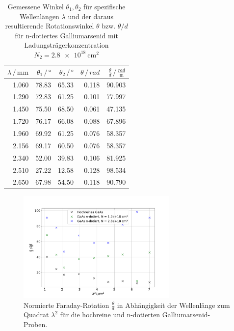 \begin{table}
    \centering
    \caption{Gemessene Winkel $\theta_1, \theta_2$ für spezifische Wellenlängen $\lambda$ und der daraus resultierende Rotationswinkel $\theta$ bzw. $\theta/d$ für n-dotiertes Galliumarsenid mit Ladungsträgerkonzentration $N_2 = \qty{2.8e18}{\centi\metre^2}$}
    \label{tab:N2}
    \begin{tabular}{r r r r r}
        \toprule
        $\lambda \,/\, \unit{\milli\metre}$ & $\theta_1 \,/\, \unit{\degree}$ & $\theta_2 \,/\, \unit{\degree}$ & $\theta \,/\, \unit{rad}$ & $\frac{\theta}{d} \,/\, \frac{rad}{\unit{\metre}}$ \\
        \midrule
        1.060 & 78.83 & 65.33 & 0.118 & 90.903 \\
        1.290 & 72.83 & 61.25 & 0.101 & 77.997 \\
        1.450 & 75.50 & 68.50 & 0.061 & 47.135 \\
        1.720 & 76.17 & 66.08 & 0.088 & 67.896 \\
        1.960 & 69.92 & 61.25 & 0.076 & 58.357 \\
        2.156 & 69.17 & 60.50 & 0.076 & 58.357 \\
        2.340 & 52.00 & 39.83 & 0.106 & 81.925 \\
        2.510 & 27.22 & 12.58 & 0.128 & 98.534 \\
        2.650 & 67.98 & 54.50 & 0.118 & 90.790 \\      
        \bottomrule
    \end{tabular}
\end{table}


\begin{figure}
    \centering
    \includegraphics[width=0.7\textwidth]{figure/theta_lam2.pdf}
    \caption{Normierte Faraday-Rotation $\frac{\theta}{d}$ in Abhängigkeit der Wellenlänge zum Quadrat $\lambda^2$ für die hochreine und n-dotierten Galliumarsenid-Proben.}
    \label{fig:theta_lam2}
\end{figure}

